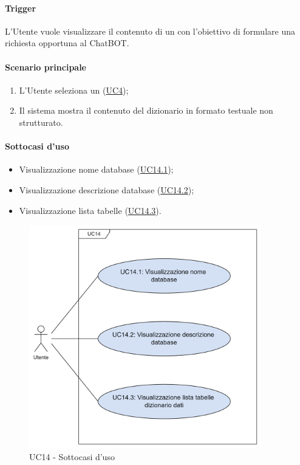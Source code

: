 \paragraph*{Trigger}
L'Utente vuole visualizzare il contenuto di un  con l'obiettivo di formulare una richiesta opportuna al ChatBOT.

\paragraph*{Scenario principale}
\begin{enumerate}
  \item L'Utente seleziona un  (\hyperref[UC4]{UC4});
  \item Il sistema mostra il contenuto del dizionario in formato testuale non strutturato.
\end{enumerate}

\paragraph*{Sottocasi d'uso}
\begin{itemize}
  \item Visualizzazione nome database (\hyperref[UC14point1]{UC14.1});
  \item Visualizzazione descrizione database (\hyperref[UC14point2]{UC14.2});
  \item Visualizzazione lista tabelle (\hyperref[UC14point3]{UC14.3}).
\end{itemize}

\begin{figure}[H]
  \centering
  \includegraphics[width=0.90\textwidth]{assets/uc14_1.png}
  \caption{UC14 - Sottocasi d'uso}
\end{figure}

